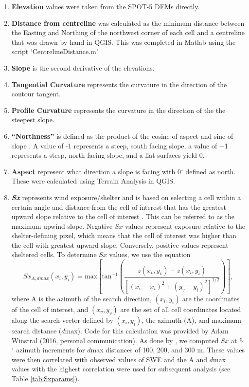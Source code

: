 \documentclass[12pt]{article}
\begin{document}
\begin{enumerate}
\item[]\textbf{Elevation} values were taken from the SPOT-5 DEMs directly.

\item[] \textbf{Distance from centreline} was calculated as the minimum distance between the Easting and Northing of the northwest corner of each cell and a centreline that was drawn by hand in QGIS. This was completed in Matlab using the script `CentrelineDistance.m'. 

\item[]  \textbf{Slope} is the second derivative of the elevations. 

\item[] \textbf{Tangential Curvature} represents the curvature in the direction of the contour tangent.

\item[] \textbf{Profile Curvature} represents the curvature in the direction of the the steepest slope.

\item[] \textbf{``Northness''} is defined as the product of the cosine of aspect and sine of slope \citep{Molotch2005}. A value of -1 represents a steep, south facing slope, a value of +1 represents a steep, north facing slope, and a flat surfaces yield 0. 

\item[] \textbf{Aspect} represent what direction a slope is facing with 0${^\circ}$ defined as north. These were calculated using Terrain Analysis in QGIS. 

\item[] \textbf{\textit{Sx}} represents wind exposure/shelter and is based on selecting a cell within a certain angle and distance from the cell of interest that has the greatest upward slope relative to the cell of interest \citep{Winstral2002}. This can be referred to as the maximum upwind slope. Negative $Sx$ values represent exposure relative to the shelter-defining pixel, which means that the cell of interest was higher than the cell with greatest upward slope. Conversely, positive values represent sheltered cells. To determine $Sx$ values, we use the equation
\begin{equation}
Sx_{A, dmax}(x_i, y_i) = \textrm{max} \left[ \textrm{tan}^{-1} \left( \frac{z(x_v,y_v)-z(x_i,y_i)}{[(x_v-x_i)^2+(y_v-y_i)^2]^{1/2}} \right) \right] ,
\end{equation}
where A is the azimuth of the search direction, $(x_i, y_i)$ are the coordinates of the cell of interest, and $(x_v, y_v)$ are the set of all cell coordinates located along the search vector defined by	$(x_i, y_i)$, the azimuth (A), and maximum search distance ($d$max). Code for this calculation was provided by Adam Winstral (2016, personal communication). As done by \cite{McGrath2015}, we computed $Sx$ at 5$^{\circ}$ azimuth increments for $d$max distances of 100, 200, and 300 m. These values were then correlated with observed values of SWE and the A and $d$max values with the highest correlation were used for subsequent analysis (see Table \ref{tab:Sxparams}). 


\end{enumerate}
\end{document}
